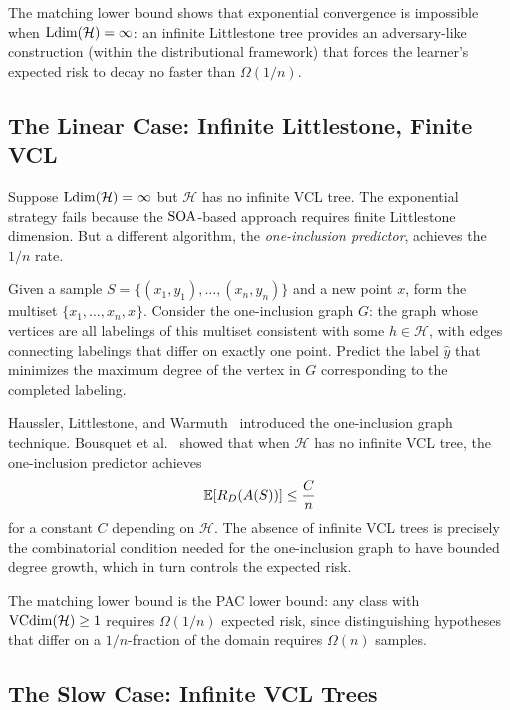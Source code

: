 The matching lower bound shows that exponential convergence is impossible
when $\mathrm{Ldim}(\mathcal{H}) = \infty$: an infinite Littlestone tree provides an
adversary-like construction (within the distributional framework) that
forces the learner's expected risk to decay no faster than $\Omega(1/n)$.


\subsection{The Linear Case: Infinite Littlestone, Finite VCL}
\label{sec:linear-case}

Suppose $\mathrm{Ldim}(\mathcal{H}) = \infty$ but $\mathcal{H}$ has no infinite VCL
tree.  The exponential strategy fails because the $\mathrm{SOA}$-based approach
requires finite Littlestone dimension.  But a different algorithm, the
\emph{one-inclusion predictor}, achieves the $1/n$ rate.

\begin{defn}
\label{def:oip}
Given a sample $S = \{(x_1, y_1), \ldots, (x_n, y_n)\}$ and a new point
$x$, form the multiset $\{x_1, \ldots, x_n, x\}$.  Consider the one-inclusion
graph $G$: the graph whose vertices are all labelings of this multiset
consistent with some $h \in \mathcal{H}$, with edges connecting labelings
that differ on exactly one point.  Predict the label $\hat{y}$ that
minimizes the maximum degree of the vertex in $G$ corresponding to the
completed labeling.
\end{defn}

Haussler, Littlestone, and Warmuth~\cite{Haussler1988} introduced the
one-inclusion graph technique.  Bousquet et
al.~\cite{BousquetHannekeMoranVanHandelYehudayoff2021} showed that when
$\mathcal{H}$ has no infinite VCL tree, the one-inclusion predictor achieves
\[
  \mathbb{E}[R_D(A(S))] \leq \frac{C}{n}
\]
for a constant $C$ depending on $\mathcal{H}$.  The absence of infinite VCL
trees is precisely the combinatorial condition needed for the one-inclusion
graph to have bounded degree growth, which in turn controls the expected
risk.

The matching lower bound is the PAC lower bound: any class with
$\mathrm{VCdim}(\mathcal{H}) \geq 1$ requires $\Omega(1/n)$ expected risk, since
distinguishing hypotheses that differ on a $1/n$-fraction of the domain
requires $\Omega(n)$ samples.


\subsection{The Slow Case: Infinite VCL Trees}
\label{sec:slow-case}

